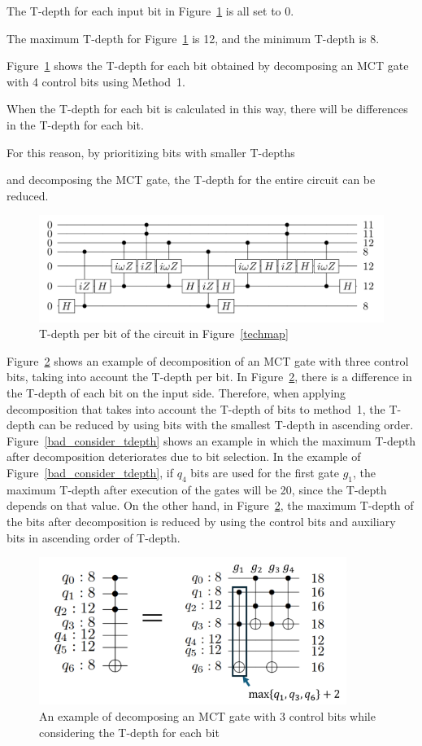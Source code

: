 The T-depth for each input bit in Figure~\ref{bit_tdepth} is all set to 0.

The maximum T-depth for Figure~\ref{bit_tdepth} is 12,
and the minimum T-depth is 8.

Figure~\ref{bit_tdepth} shows the T-depth for each bit obtained by decomposing an MCT gate with 4 control bits using Method~1.

When the T-depth for each bit is calculated in this way, there will be differences in the T-depth for each bit.

For this reason, by prioritizing bits with smaller T-depths

and decomposing the MCT gate, the T-depth for the entire circuit can be reduced.
\begin{figure}
\centering
\includegraphics[width=14cm]{img/bit_tdepth.pdf}
\caption{T-depth per bit of the circuit in Figure~\ref{techmap}}
\label{bit_tdepth}
\end{figure}
\par
Figure~\ref{consider_tdepth} shows an example of decomposition of an MCT gate with three control bits, taking into account the T-depth per bit.
In Figure~\ref{consider_tdepth}, there is a difference in the T-depth of each bit on the input side.
Therefore, when applying decomposition that takes into account the T-depth of bits to method~1,
the T-depth can be reduced by using bits with the smallest T-depth in ascending order.
Figure~\ref{bad_consider_tdepth} shows an example in which the maximum T-depth after decomposition deteriorates due to bit selection.
In the example of Figure~\ref{bad_consider_tdepth},
if $q_{4}$ bits are used for the first gate $g_{1}$,
the maximum T-depth after execution of the  gates will be 20, since the T-depth depends on that value.
On the other hand, in Figure~\ref{consider_tdepth},
the maximum T-depth of the bits after decomposition is reduced by using the control bits and auxiliary bits in ascending order of T-depth.
\begin{figure}[tbp]
\centering
\includegraphics[width=10cm]{img/considering_bit_tdepth.pdf}
\caption{An example of decomposing an MCT gate with 3 control bits while considering the T-depth for each bit}
\label{consider_tdepth}
\end{figure}
